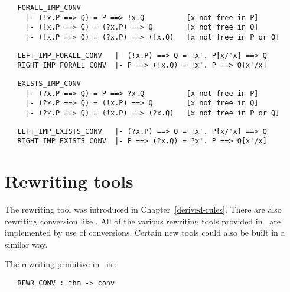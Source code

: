 \begin{hol}\begin{verbatim}
   FORALL_IMP_CONV   
     |- (!x.P ==> Q) = P ==> !x.Q          [x not free in P]
     |- (!x.P ==> Q) = (?x.P) ==> Q        [x not free in Q]
     |- (!x.P ==> Q) = (?x.P) ==> (!x.Q)   [x not free in P or Q]
\end{verbatim}\end{hol}

\begin{hol}\begin{verbatim}
   LEFT_IMP_FORALL_CONV   |- (!x.P) ==> Q = !x'. P[x/'x] ==> Q
   RIGHT_IMP_FORALL_CONV  |- P ==> (!x.Q) = !x'. P ==> Q[x'/x]
\end{verbatim}\end{hol}

\begin{hol}\begin{verbatim}
   EXISTS_IMP_CONV   
     |- (?x.P ==> Q) = P ==> ?x.Q          [x not free in P]
     |- (?x.P ==> Q) = (!x.P) ==> Q        [x not free in Q]
     |- (?x.P ==> Q) = (!x.P) ==> (?x.Q)   [x not free in P or Q]
\end{verbatim}\end{hol}

\begin{hol}\begin{verbatim}
   LEFT_IMP_EXISTS_CONV   |- (?x.P) ==> Q = !x'. P[x/'x] ==> Q
   RIGHT_IMP_EXISTS_CONV  |- P ==> (?x.Q) = ?x'. P ==> Q[x'/x]
\end{verbatim}\end{hol}


\section{Rewriting tools}
\label{avra3}

The rewriting tool
 was introduced 
in Chapter~\ref{derived-rules}.
There are also rewriting conversion like .
All of the various rewriting tools provided in \HOL\
are implemented by use of conversions. 
Certain new tools could also be built in a similar way.

The rewriting primitive in \HOL\ is :

\begin{boxed}
\begin{verbatim}
   REWR_CONV : thm -> conv
\end{verbatim}\end{boxed}

